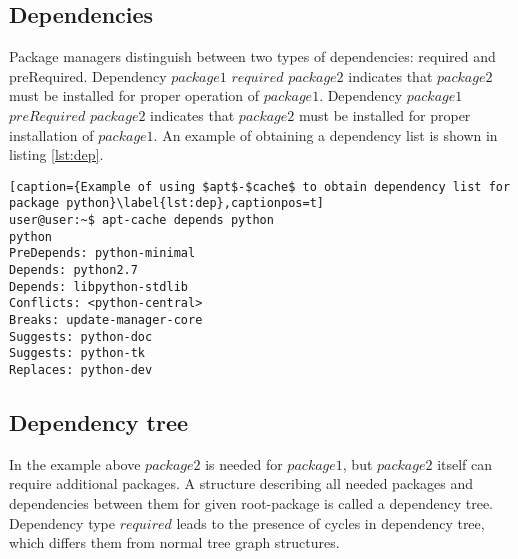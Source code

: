 \subsection*{Dependencies} \label{subs:dep}
Package managers distinguish between two types of dependencies: required and preRequired.
Dependency $package1$ $required$ $package2$ indicates that $package2$ must be installed for proper operation of $package1$.
Dependency $package1$ $preRequired$ $package2$ indicates that $package2$ must be installed for proper installation of $package1$.
An example of obtaining a dependency list is shown in listing \ref{lst:dep}.
\begin{lstlisting}[caption={Example of using $apt$-$cache$ to obtain dependency list for package python}\label{lst:dep},captionpos=t] 
user@user:~$ apt-cache depends python
python
PreDepends: python-minimal
Depends: python2.7
Depends: libpython-stdlib
Conflicts: <python-central>
Breaks: update-manager-core
Suggests: python-doc
Suggests: python-tk
Replaces: python-dev
\end{lstlisting}
\subsection*{Dependency tree}
In the example above $package2$ is needed for $package1$, but $package2$ itself can require additional packages.
A structure describing all needed packages and dependencies between them for given root-package is called a dependency tree. 
Dependency type $required$ leads to the presence of cycles in dependency tree, which differs them from normal tree graph structures.


